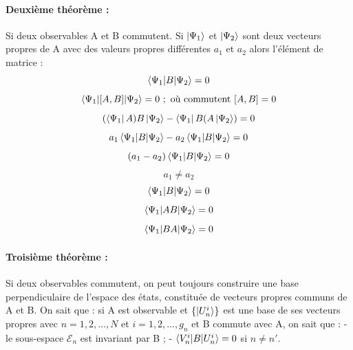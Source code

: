 \documentclass[12pt,a4paper,titlepage]{book}
\begin{document}
\paragraph*{Deuxième théorème :}

Si deux observables A et B commutent. Si $\ket{\Psi_1}$ et $\ket{\Psi_2}$ sont deux vecteurs propres de A avec des valeurs propres différentes $a_1$ et $a_2$ alors l'élément de matrice :
\begin{equation*}
\braket{\Psi_1 | B | \Psi_2} = 0
\end{equation*}
\begin{equation*}
\braket{\Psi_1 | [A,B] | \Psi_2} = 0 ~;~ \text{où commutent}~ [A,B] = 0
\end{equation*}
\begin{equation*}
(\bra{\Psi_1} A) B\ket{\Psi_2} - \bra{\Psi_1} B (A \ket{\Psi_2}) = 0
\end{equation*}
\begin{equation*}
a_1 \braket{\Psi_1 | B | \Psi_2} - a_2 \braket{\Psi_1 | B | \Psi_2} = 0
\end{equation*}
\begin{equation*}
(a_1 - a_2) \braket{\Psi_1 | B | \Psi_2} = 0
\end{equation*}
\begin{equation*}
a_1 \neq a_2
\end{equation*}
\begin{equation*}
\braket{\Psi_1 | B | \Psi_2} = 0
\end{equation*}
\begin{equation*}
\braket{\Psi_1 | AB | \Psi_2} = 0
\end{equation*}
\begin{equation*}
\braket{\Psi_1 | BA | \Psi_2} = 0
\end{equation*}

\paragraph*{Troisième théorème :}

Si deux observables commutent, on peut toujours construire une base perpendiculaire de l'espace des états, constituée de vecteurs propres communs de A et B. On sait que : si A est observable et $\lbrace \ket{U_n^i} \rbrace$ est une base de ses vecteurs propres avec $n = 1, 2, \ldots, N$ et $i = 1, 2, \ldots, g_n$ et B commute avec A, on sait que : - le sous-espace $\mathcal{E}_n$ est invariant par B ; - $\braket{V_n^i | B | U_n^i} = 0$ si $n \neq n'$. \\
\end{document}
